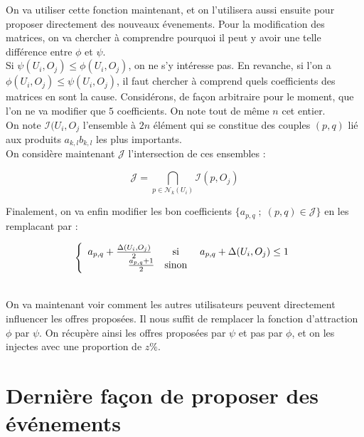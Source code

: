 \documentclass[11pt, oneside]{article}
\begin{document}
On va utiliser cette fonction maintenant, et on l'utilisera aussi ensuite pour proposer directement des nouveaux évenements. Pour la modification des matrices, on va chercher à comprendre pourquoi il peut y avoir une telle différence entre $\phi$ et $\psi$. \\
 Si $\psi(U_i,O_j) \leq \phi(U_i,O_j)$, on ne s'y intéresse pas. En revanche, si l'on a $\phi(U_i,O_j) \leq \psi(U_i,O_j)$, il faut chercher à comprend quels coefficients des matrices en sont la cause. Considérons, de façon arbitraire pour le moment, que l'on ne va modifier que $5$ coefficients. On note tout de même $n$ cet entier. \\
On note $\mathcal{I} (U_i,O_j$ l'ensemble à $2n$ élément qui se constitue des couples $(p,q)$ lié aux produits $a_{k,l}b_{k,l} $ les plus importants. \\
On considère maintenant $\mathcal{J}$ l'intersection de ces ensembles :
\begin{center}
\[
\mathcal{J} = \bigcap _{p \in \mathcal{N} _k (U_i) } \mathcal{I} (p,O_j)
\]

\end{center}

Finalement, on va enfin modifier les bon coefficients $\{a_{p,q} \; ; \; (p,q) \in \mathcal{J} \} $ en les remplacant par :
\begin{center}
\[
 \left \{
   \begin{array}{r c l}
       a_{p,q} + \frac{\Delta (U_i,O_j)}{2} \;  &\text{si}& \; a_{p,q} + \Delta (U_i,O_j) \leq 1  \\
       \frac{ a_{p,q} + 1}{2} &\text{sinon}& \\
   \end{array}
   \right .
\]
\end{center}
\\

On va maintenant voir comment les autres utilisateurs peuvent directement influencer les offres proposées. Il nous suffit de remplacer la fonction d'attraction $\phi$ par $\psi$. On récupère ainsi les offres proposées par $\psi$ et pas par $\phi$, et on les injectes avec une proportion de $z \%$.

\section{Dernière façon de proposer des événements}
\end{document}
